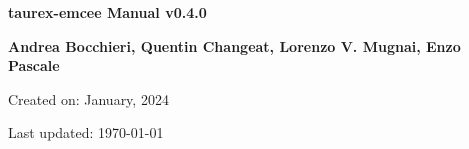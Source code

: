 

\begin{titlepage}

    \centering

    \vspace*{30mm} %
    \textbf{\Huge {taurex-emcee Manual v0.4.0}}


    \vspace{25mm}
    \Large \textbf{{Andrea Bocchieri, Quentin Changeat, Lorenzo V. Mugnai, Enzo Pascale}}

    \vspace*{8mm}
    \small Created on: January, 2024

    \vspace{2mm}
    \small Last updated: \MonthYearFormat\today


\end{titlepage}

\clearpage
{}
\tableofcontents
\listoffigures
\listoftables
\clearpage
{}